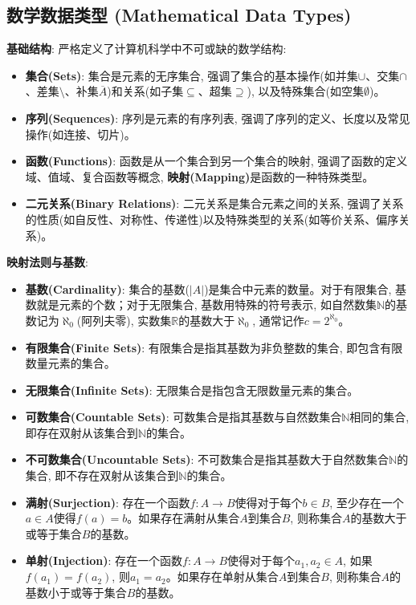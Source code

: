 \documentclass[12pt, a4paper, UTF8]{ctexart}
\newcommand{\term}[1]{\textbf{\textcolor{blue!80!black}{#1}}}
\newcommand{\emphb}[1]{\textbf{#1}}
\begin{document}
\begin{sloppypar}
    \subsection{数学数据类型 (Mathematical Data Types)}
    \emphb{基础结构}: 严格定义了计算机科学中不可或缺的数学结构:
    \begin{itemize}[nosep]
        \item \term{集合(Sets)}: 集合是元素的无序集合, 强调了集合的基本操作(如并集$\cup$、交集$\cap$、差集$\setminus$、补集$\overline{A}$)和关系(如子集$\subseteq$、超集$\supseteq$), 以及特殊集合(如空集$\emptyset$)。
        \item \term{序列(Sequences)}: 序列是元素的有序列表, 强调了序列的定义、长度以及常见操作(如连接、切片)。
        \item \term{函数(Functions)}: 函数是从一个集合到另一个集合的映射, 强调了函数的定义域、值域、复合函数等概念, \term{映射(Mapping)}是函数的一种特殊类型。
        \item \term{二元关系(Binary Relations)}: 二元关系是集合元素之间的关系, 强调了关系的性质(如自反性、对称性、传递性)以及特殊类型的关系(如等价关系、偏序关系)。
    \end{itemize}
    \emphb{映射法则与基数}:
    \begin{itemize}[nosep]
        \item \term{基数(Cardinality)}: 集合的基数($|A|$)是集合中元素的数量。对于有限集合, 基数就是元素的个数；对于无限集合, 基数用特殊的符号表示, 如自然数集$\mathbb{N}$的基数记为$\aleph_0$(阿列夫零), 实数集$\mathbb{R}$的基数大于$\aleph_0$, 通常记作$c=2^{\aleph_0}$。
        \item \term{有限集合(Finite Sets)}: 有限集合是指其基数为非负整数的集合, 即包含有限数量元素的集合。
        \item \term{无限集合(Infinite Sets)}: 无限集合是指包含无限数量元素的集合。
        \item \term{可数集合(Countable Sets)}: 可数集合是指其基数与自然数集合$\mathbb{N}$相同的集合, 即存在双射从该集合到$\mathbb{N}$的集合。
        \item \term{不可数集合(Uncountable Sets)}: 不可数集合是指其基数大于自然数集合$\mathbb{N}$的集合, 即不存在双射从该集合到$\mathbb{N}$的集合。
        \item \term{满射(Surjection)}: 存在一个函数$f: A \to B$使得对于每个$b \in B$, 至少存在一个$a \in A$使得$f(a) = b$。如果存在满射从集合$A$到集合$B$, 则称集合$A$的基数大于或等于集合$B$的基数。
        \item \term{单射(Injection)}: 存在一个函数$f: A \to B$使得对于每个$a_1, a_2 \in A$, 如果$f(a_1) = f(a_2)$, 则$a_1 = a_2$。如果存在单射从集合$A$到集合$B$, 则称集合$A$的基数小于或等于集合$B$的基数。

\end{itemize}
\end{sloppypar}
\end{document}
